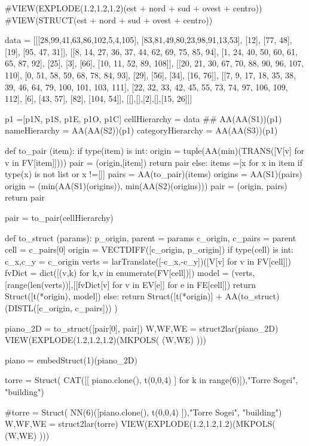 #VIEW(EXPLODE(1.2,1.2,1.2)(est + nord + sud + ovest + centro))
#VIEW(STRUCT(est + nord + sud + ovest + centro))




data = [[[28,99,41,63,86,102,5,4,105],
 [83,81,49,80,23,98,91,13,53],
 [12],
 [77, 48],
 [19],
 [95, 47, 31]],
[[8, 14, 27, 36, 37, 44, 62, 69, 75, 85, 94],
 [1, 24, 40, 50, 60, 61, 65, 87, 92],
 [25],
 [3],
 [66],
 [10, 11, 52, 89, 108]],
[[20, 21, 30, 67, 70, 88, 90, 96, 107, 110],
 [0, 51, 58, 59, 68, 78, 84, 93],
 [29],
 [56],
 [34],
 [16, 76]],
[[7, 9, 17, 18, 35, 38, 39, 46, 64, 79, 100, 101, 103, 111],
 [22, 32, 33, 42, 45, 55, 73, 74, 97, 106, 109, 112],
 [6],
 [43, 57],
 [82],
 [104, 54]],
[[],[],[2],[],[15, 26]]]


p1 =[p1N, p1S, p1E, p1O, p1C]
cellHierarchy = data  ## AA(AA(S1))(p1)
nameHierarchy = AA(AA(S2))(p1)
categoryHierarchy = AA(AA(S3))(p1)


def to_pair (item):
  if type(item) is int:
    origin = tuple(AA(min)(TRANS([V[v] for v in FV[item]])))
    pair = (origin,[item])
    return pair
  else:
    items =[x for x in item if type(x) is not list or x !=[]]
    pairs = AA(to_pair)(items)
    origins = AA(S1)(pairs)
    origin = (min(AA(S1)(origins)), min(AA(S2)(origins)))
    pair = (origin, pairs)
    return pair
    
pair = to_pair(cellHierarchy)

def to_struct (params):
    p_origin, parent = params
    c_origin, c_pairs = parent
    cell = c_pairs[0]
    origin = VECTDIFF([c_origin, p_origin])
    if type(cell) is int:        
        c_x,c_y = c_origin
        verts = larTranslate([-c_x,-c_y])([V[v] for v in FV[cell]])
        fvDict = dict([(v,k) for k,v in enumerate(FV[cell])])
        model = (verts,[range(len(verts))],[[fvDict[v] for v in EV[e]] for e in FE[cell]])
        return Struct([t(*origin), model])
    else:
        return Struct([t(*origin)] + AA(to_struct)(DISTL([c_origin, c_pairs])) )


piano_2D = to_struct([pair[0], pair])
W,WF,WE = struct2lar(piano_2D)
VIEW(EXPLODE(1.2,1.2,1.2)(MKPOLS( (W,WE) )))

piano = embedStruct(1)(piano_2D)


torre = Struct( CAT([[ piano.clone(), t(0,0,4) ] for k in range(6)]),"Torre Sogei", "building")

#torre = Struct( NN(6)([piano.clone(), t(0,0,4) ]),"Torre Sogei", "building")
W,WF,WE = struct2lar(torre)
VIEW(EXPLODE(1.2,1.2,1.2)(MKPOLS( (W,WE) )))


